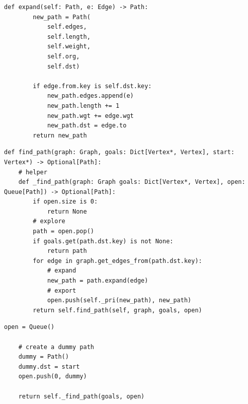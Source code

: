 \documentclass[mathserif, handout]{beamer}
\begin{document}
\begin{frame}[fragile]
  \begin{thmboxbot}
    \begin{lstlisting}[style=mypython, firstnumber=last]
    def expand(self: Path, e: Edge) -> Path:
        new_path = Path(
            self.edges,
            self.length,
            self.weight,
            self.org,
            self.dst)
            
        if edge.from.key is self.dst.key:
            new_path.edges.append(e)
            new_path.length += 1
            new_path.wgt += edge.wgt
            new_path.dst = edge.to
        return new_path
\end{lstlisting}
  \end{thmboxbot}
\end{frame}

\begin{frame}[fragile]
  \vspace{-5mm}
  \begin{thmboxtop}
    \begin{lstlisting}[style=mypython]
def find_path(graph: Graph, goals: Dict[Vertex*, Vertex], start: Vertex*) -> Optional[Path]:
    # helper
    def _find_path(graph: Graph goals: Dict[Vertex*, Vertex], open: Queue[Path]) -> Optional[Path]:
        if open.size is 0:
            return None
        # explore
        path = open.pop()
        if goals.get(path.dst.key) is not None:
            return path
        for edge in graph.get_edges_from(path.dst.key):
            # expand
            new_path = path.expand(edge)
            # export
            open.push(self._pri(new_path), new_path)
        return self.find_path(self, graph, goals, open)
\end{lstlisting}
  \end{thmboxtop}
\end{frame}

\begin{frame}[fragile]
  \begin{thmboxbot}
    \begin{lstlisting}[style=mypython, firstnumber=last]
    open = Queue()

    # create a dummy path
    dummy = Path()
    dummy.dst = start
    open.push(0, dummy)
    
    return self._find_path(goals, open)
\end{lstlisting}
  \end{thmboxbot}
\end{frame}
\end{document}
